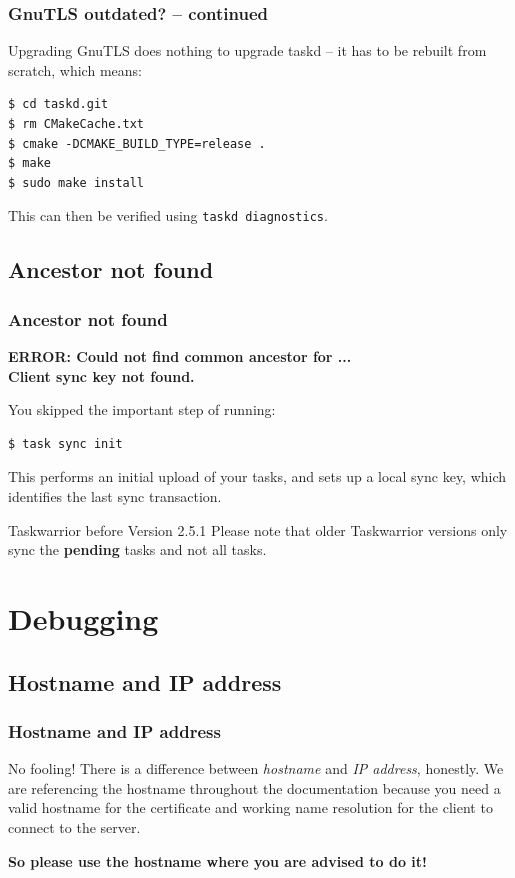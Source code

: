 \documentclass[t,handout]{beamer}
\begin{document}
\begin{frame}[fragile]\frametitle{GnuTLS outdated? -- continued}
    Upgrading GnuTLS does nothing to upgrade taskd -- it has to be rebuilt from scratch, which means:

    \begin{lstlisting}
$ cd taskd.git
$ rm CMakeCache.txt
$ cmake -DCMAKE_BUILD_TYPE=release .
$ make
$ sudo make install\end{lstlisting}

    This can then be verified using \verb+taskd diagnostics+.
\end{frame}

\subsection{Ancestor not found}

\begin{frame}[fragile]\frametitle{Ancestor not found}
    \textbf{ERROR: Could not find common ancestor for ...\\
Client sync key not found.}

    You skipped the important step of running:
    \begin{lstlisting}
$ task sync init\end{lstlisting}

    This performs an initial upload of your tasks, and sets up a local sync key, which identifies the last sync transaction.

    \begin{alertblock}{Taskwarrior before Version 2.5.1}
        Please note that older Taskwarrior versions only sync the \textbf{pending} tasks and not all tasks.
    \end{alertblock}
\end{frame}

\section{Debugging}

\subsection{Hostname and IP address}

\begin{frame}[fragile]\frametitle{Hostname and IP address}
    \vfill
    \begin{alertblock}{No fooling!}
        There is a difference between \textit{hostname} and \textit{IP address}, honestly. We are referencing the hostname throughout the documentation because you need a valid hostname for the certificate and working name resolution for the client to connect to the server.

        \textbf{So please use the hostname where you are advised to do it!}
    \end{alertblock}
    \vfill
\end{frame}
\end{document}
